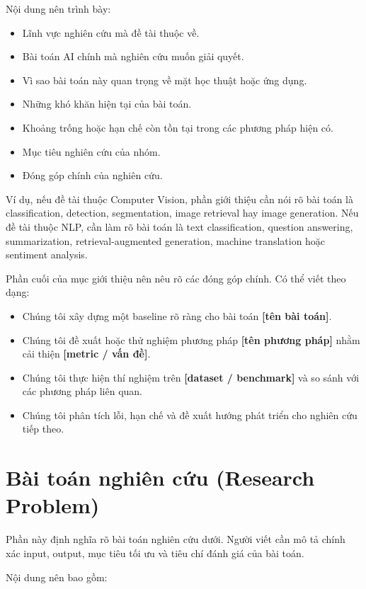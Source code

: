 \documentclass[12pt]{ai_conquer2026}
\begin{document}
Nội dung nên trình bày:

\begin{itemize}
\item Lĩnh vực nghiên cứu mà đề tài thuộc về.
\item Bài toán AI chính mà nghiên cứu muốn giải quyết.
\item Vì sao bài toán này quan trọng về mặt học thuật hoặc ứng dụng.
\item Những khó khăn hiện tại của bài toán.
\item Khoảng trống hoặc hạn chế còn tồn tại trong các phương pháp hiện có.
\item Mục tiêu nghiên cứu của nhóm.
\item Đóng góp chính của nghiên cứu.
\end{itemize}

Ví dụ, nếu đề tài thuộc Computer Vision, phần giới thiệu cần nói rõ bài toán là classification, detection, segmentation, image retrieval hay image generation. Nếu đề tài thuộc NLP, cần làm rõ bài toán là text classification, question answering, summarization, retrieval-augmented generation, machine translation hoặc sentiment analysis.

Phần cuối của mục giới thiệu nên nêu rõ các đóng góp chính. Có thể viết theo dạng:

\begin{itemize}
\item Chúng tôi xây dựng một baseline rõ ràng cho bài toán \textbf{[tên bài toán]}.
\item Chúng tôi đề xuất hoặc thử nghiệm phương pháp \textbf{[tên phương pháp]} nhằm cải thiện \textbf{[metric / vấn đề]}.
\item Chúng tôi thực hiện thí nghiệm trên \textbf{[dataset / benchmark]} và so sánh với các phương pháp liên quan.
\item Chúng tôi phân tích lỗi, hạn chế và đề xuất hướng phát triển cho nghiên cứu tiếp theo.
\end{itemize}

\section{Bài toán nghiên cứu (Research Problem)}

Phần này định nghĩa rõ bài toán nghiên cứu dưới. Người viết cần mô tả chính xác input, output, mục tiêu tối ưu và tiêu chí đánh giá của bài toán.

Nội dung nên bao gồm:
\end{document}
